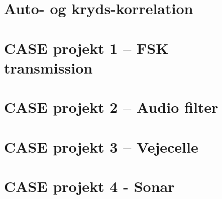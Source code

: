 \documentclass[danish]{article}
\begin{document}
\section{Auto- og kryds-korrelation}

\section{CASE projekt 1 – FSK transmission}

\section{CASE projekt 2 – Audio filter}

\section{CASE projekt 3 – Vejecelle}

\section{CASE projekt 4 - Sonar}
\end{document}
